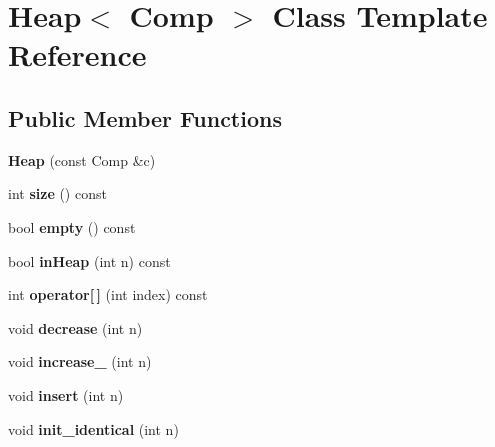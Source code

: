 \hypertarget{classHeap}{\section{\-Heap$<$ \-Comp $>$ \-Class \-Template \-Reference}
\label{classHeap}
}
\subsection*{\-Public \-Member \-Functions}
\begin{DoxyCompactItemize}
\item 
\hypertarget{classHeap_acec83ccbc9fd67b1e2fc9f182bd59317}{{\bfseries \-Heap} (const \-Comp \&c)}\label{classHeap_acec83ccbc9fd67b1e2fc9f182bd59317}

\item 
\hypertarget{classHeap_a1df0c4d5ea60b18a2f3e1c3ff5655c44}{int {\bfseries size} () const }\label{classHeap_a1df0c4d5ea60b18a2f3e1c3ff5655c44}

\item 
\hypertarget{classHeap_a35e73481fcd46b6be1e1f80a47507a50}{bool {\bfseries empty} () const }\label{classHeap_a35e73481fcd46b6be1e1f80a47507a50}

\item 
\hypertarget{classHeap_a4b4012639a72a9e763e370c414c24167}{bool {\bfseries in\-Heap} (int n) const }\label{classHeap_a4b4012639a72a9e763e370c414c24167}

\item 
\hypertarget{classHeap_ad4b243701b1944b645ec06a09a4a497a}{int {\bfseries operator\mbox{[}$\,$\mbox{]}} (int index) const }\label{classHeap_ad4b243701b1944b645ec06a09a4a497a}

\item 
\hypertarget{classHeap_a7766a74f069e51d829419b6bca3f5134}{void {\bfseries decrease} (int n)}\label{classHeap_a7766a74f069e51d829419b6bca3f5134}

\item 
\hypertarget{classHeap_a6f5ab48e1b3b99e704080628ce6fc666}{void {\bfseries increase\-\_\-} (int n)}\label{classHeap_a6f5ab48e1b3b99e704080628ce6fc666}

\item 
\hypertarget{classHeap_a078b00c9c59a7d46e4daa48ad81527a0}{void {\bfseries insert} (int n)}\label{classHeap_a078b00c9c59a7d46e4daa48ad81527a0}

\item 
\hypertarget{classHeap_a6ae9aab43f5e2ec23722a20113b802e4}{void {\bfseries init\-\_\-identical} (int n)}\label{classHeap_a6ae9aab43f5e2ec23722a20113b802e4}


\end{DoxyCompactItemize}
